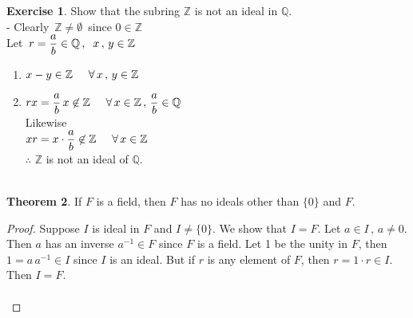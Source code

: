 \documentclass[11pt,a4paper]{article}
\theoremstyle{definition}
\newtheorem{thm}{Theorem}[subsection]
\newtheorem{exe}[thm]{Exercise}
\begin{document}
\begin{exe}
Show that the subring $\mathbb{Z}$ is not an ideal in $\mathbb{Q}$.\\

- Clearly $\, \mathbb{Z} \neq \emptyset\, $ since $0\in \mathbb{Z}$\\

Let $\, r = \dfrac{a}{b}\in \mathbb{Q}\, , \hspace{0.2cm} x\, , \, y\in \mathbb{Z}$
\begin{enumerate}
\item $x - y \in \mathbb{Z}\hspace{0.5cm} \forall\, x\, , \, y \in \mathbb{Z}$

\item $rx = \dfrac{a}{b}\, x\not\in \mathbb{Z}\hspace{0.5cm}\forall\, x\in \mathbb{Z}\, , \, \dfrac{a}{b}\in \mathbb{Q}$\\

Likewise\\

$x r = x\cdot \dfrac{a}{b}\not\in \mathbb{Z}\hspace{0.5cm} \forall \, x \in \mathbb{Z}$\\

$\therefore\,\, \mathbb{Z}$ is not an ideal of $\mathbb{Q}$.\\\\
\end{enumerate}
\end{exe}








\begin{thm}
If $F$ is a field, then $F$ has no ideals other than $\{0\}$ and $F$.\\
\end{thm}

\begin{proof}
Suppose $I$ is ideal in $F$ and $I\neq \{0\}$. We show that $I = F$. Let $a\in I\, , \, a\neq 0$. Then $a$ has an inverse $a^{-1} \in F$ since $F$ is a field. Let 1 be the unity in $F$, then $1 = a\, a^{-1} \in I$ since $I$ is an ideal. But if $r$ is any element of $F$, then $r = 1\cdot r\in I$. Then $I = F$.\\\\
\end{proof}
\end{document}
